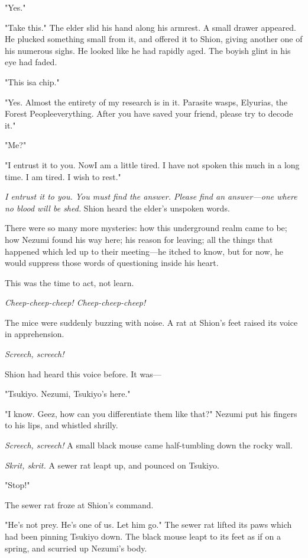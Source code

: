 "Yes."

"Take this." The elder slid his hand along his armrest. A small drawer
appeared. He plucked something small from it, and offered it to Shion,
giving another one of his numerous sighs. He looked like he had rapidly
aged. The boyish glint in his eye had faded.

"This is\el a chip."

"Yes. Almost the entirety of my research is in it. Parasite wasps,
Elyurias, the Forest People\el everything. After you have saved your
friend, please try to decode it."

"Me?"

"I entrust it to you. Now\el I am a little tired. I have not spoken this
much in a long time. I am tired. I wish to rest."

\emph{I entrust it to you. You must find the answer. Please find an answer---one
where no blood will be shed.} Shion heard the elder's unspoken words.

There were so many more mysteries: how this underground realm came to
be; how Nezumi found his way here; his reason for leaving; all the
things that happened which led up to their meeting---he itched to know,
but for now, he would suppress those words of questioning inside his
heart.

This was the time to act, not learn.

\emph{Cheep-cheep-cheep! Cheep-cheep-cheep!}

The mice were suddenly buzzing with noise. A rat at Shion's feet raised
its voice in apprehension.

\emph{Screech, screech!}

Shion had heard this voice before. It was---

"Tsukiyo. Nezumi, Tsukiyo's here."

"I know. Geez, how can you differentiate them like that?" Nezumi put his
fingers to his lips, and whistled shrilly.

\emph{Screech, screech!} A small black mouse came half-tumbling down the rocky
wall.

\emph{Skrit, skrit.} A sewer rat leapt up, and pounced on Tsukiyo.

"Stop!"

The sewer rat froze at Shion's command.

"He's not prey. He's one of us. Let him go." The sewer rat lifted its
paws which had been pinning Tsukiyo down. The black mouse leapt to its
feet as if on a spring, and scurried up Nezumi's body.

